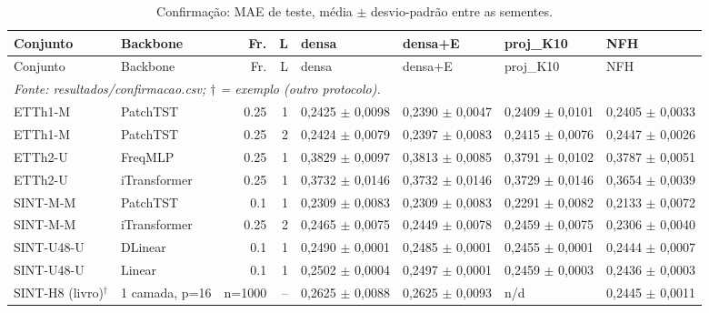 \tiny
\setlength{\tabcolsep}{2pt}
\begin{longtable}{llrrllll}
\caption{Confirma\c{c}\~ao: MAE de teste, m\'edia $\pm$ desvio-padr\~ao entre as sementes.}\label{tab:conf_mae}\\
\toprule
Conjunto & Backbone & Fr. & L & densa & densa+E & proj\_K10 & NFH \\ \midrule
\endfirsthead
\toprule
Conjunto & Backbone & Fr. & L & densa & densa+E & proj\_K10 & NFH \\ \midrule
\endhead
\bottomrule
\multicolumn{8}{l}{\textit{Fonte: resultados/confirmacao.csv; $\dagger$ = exemplo (outro protocolo).}}\\
\endlastfoot
ETTh1-M & PatchTST & 0.25 & 1 & 0,2425 $\pm$ 0,0098 & 0,2390 $\pm$ 0,0047 & 0,2409 $\pm$ 0,0101 & 0,2405 $\pm$ 0,0033 \\
ETTh1-M & PatchTST & 0.25 & 2 & 0,2424 $\pm$ 0,0079 & 0,2397 $\pm$ 0,0083 & 0,2415 $\pm$ 0,0076 & 0,2447 $\pm$ 0,0026 \\
ETTh2-U & FreqMLP & 0.25 & 1 & 0,3829 $\pm$ 0,0097 & 0,3813 $\pm$ 0,0085 & 0,3791 $\pm$ 0,0102 & 0,3787 $\pm$ 0,0051 \\
ETTh2-U & iTransformer & 0.25 & 1 & 0,3732 $\pm$ 0,0146 & 0,3732 $\pm$ 0,0146 & 0,3729 $\pm$ 0,0146 & 0,3654 $\pm$ 0,0039 \\
SINT-M-M & PatchTST & 0.1 & 1 & 0,2309 $\pm$ 0,0083 & 0,2309 $\pm$ 0,0083 & 0,2291 $\pm$ 0,0082 & 0,2133 $\pm$ 0,0072 \\
SINT-M-M & iTransformer & 0.25 & 2 & 0,2465 $\pm$ 0,0075 & 0,2449 $\pm$ 0,0078 & 0,2459 $\pm$ 0,0075 & 0,2306 $\pm$ 0,0040 \\
SINT-U48-U & DLinear & 0.1 & 1 & 0,2490 $\pm$ 0,0001 & 0,2485 $\pm$ 0,0001 & 0,2455 $\pm$ 0,0001 & 0,2444 $\pm$ 0,0007 \\
SINT-U48-U & Linear & 0.1 & 1 & 0,2502 $\pm$ 0,0004 & 0,2497 $\pm$ 0,0001 & 0,2459 $\pm$ 0,0003 & 0,2436 $\pm$ 0,0003 \\
SINT-H8 (livro)$^\dagger$ & 1 camada, p=16 & n=1000 & -- & 0,2625 $\pm$ 0,0088 & 0,2625 $\pm$ 0,0093 & n/d & 0,2445 $\pm$ 0,0011 \\
\end{longtable}
\normalsize
